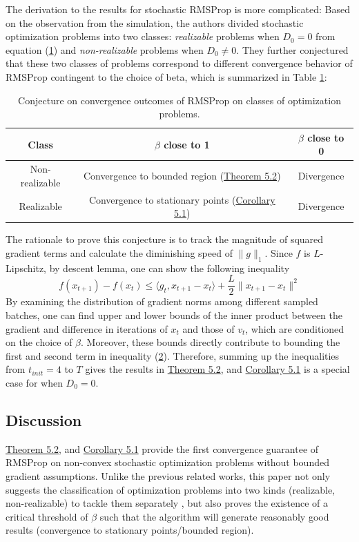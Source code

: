 \documentclass{article}
\begin{document}
\newline
The derivation to the results for stochastic RMSProp is more complicated: Based on the observation from the simulation, the authors divided stochastic optimization problems into two classes: \textit{realizable} problems when $D_0 = 0$ from equation (\hyperref[eq51]{1}) and  \textit{non-realizable} problems when $D_0 \neq 0$. They further conjectured that these two classes of problems correspond to different convergence behavior of RMSProp contingent to the choice of beta, which is summarized in Table \hyperref[tb1]{1}:
\begin{table}[h]
\label{tb1}
\centering
\begin{tabular}{c|c | c}
	\hline
	Class & $\beta$ close to 1 & $\beta$ close to 0\\
	\hline
	Non-realizable & Convergence to bounded region (\hyperref[theom51]{Theorem 5.2}) & Divergence\\
	Realizable & Convergence to stationary points (\hyperref[coro51]{Corollary 5.1}) & Divergence\\
	\hline
\end{tabular}
\vspace{1mm}
\caption{Conjecture on convergence outcomes of RMSProp on classes of optimization problems.}
\vspace{-8mm}
\end{table}
\newline
The rationale to prove this conjecture is to track the magnitude of squared gradient terms and calculate the diminishing speed of $\|g\|_1$. Since $f$ is $L$-Lipschitz, by descent lemma, one can show the following inequality
\begin{equation}
\label{eq52}
f(x_{t + 1}) - f(x_{t}) \leq \langle g_t, x_{t + 1} - x_{t}\rangle + \frac{L}{2}\|x_{t + 1} - x_{t}\|^2
\end{equation}
By examining the distribution of gradient norms among different sampled batches, one can find upper and lower bounds of the inner product between the gradient and difference in iterations of $x_t$ and those of $v_t$, which are conditioned on the choice of $\beta$. Moreover, these bounds directly contribute to bounding the first and second term in inequality  (\hyperref[eq52]{2}). Therefore, summing up the inequalities from $t_{init} = 4$ to $T$ gives the results in \hyperref[theom51]{Theorem 5.2}, and \hyperref[coro51]{Corollary 5.1} is a special case for when $D_0 = 0$.
\subsection{Discussion}
\hyperref[theom51]{Theorem 5.2}, and \hyperref[coro51]{Corollary 5.1} provide the first convergence guarantee of RMSProp on non-convex stochastic optimization problems without bounded gradient assumptions. Unlike the previous related works, this paper not only suggests the classification of optimization problems into two kinds (realizable, non-realizable) to tackle them separately , but also proves the existence of a critical threshold of $\beta$ such that the algorithm will generate reasonably good results (convergence to stationary points/bounded region).
\end{document}
